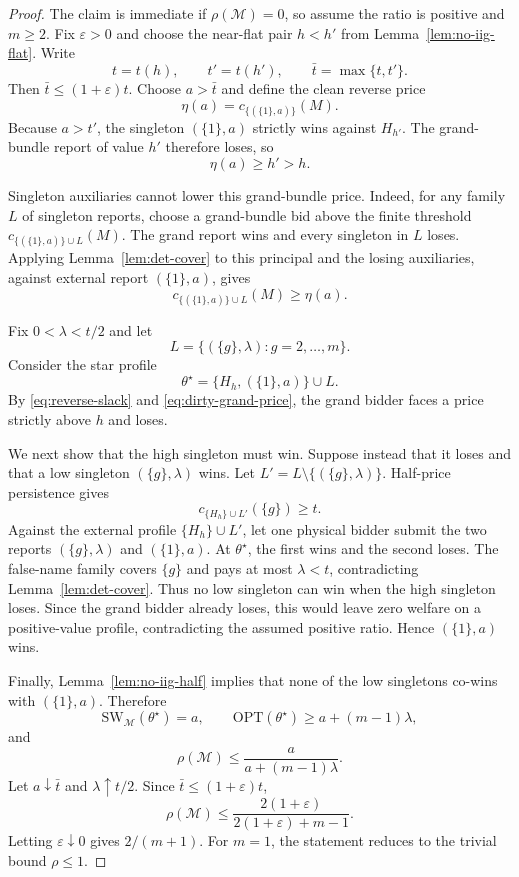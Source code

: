 \documentclass[format=acmsmall, review=false]{acmart}
\newcommand{\OPT}{\mathrm{OPT}}
\newcommand{\SW}{\mathrm{SW}}
\newcommand{\eps}{\varepsilon}
\begin{document}
\begin{proof}
The claim is immediate if $\rho(\mathcal M)=0$, so assume the ratio is
positive and $m\ge2$.  Fix $\eps>0$ and choose the near-flat pair $h<h'$ from
Lemma~\ref{lem:no-iig-flat}.  Write
\[
  t=t(h),
  \qquad
  t'=t(h'),
  \qquad
  \bar t=\max\{t,t'\}.
\]
Then $\bar t\le(1+\eps)t$.  Choose $a>\bar t$ and define the clean reverse
price
\[
  \eta(a)=c_{\{(\{1\},a)\}}(M).
\]
Because $a>t'$, the singleton $(\{1\},a)$ strictly wins against $H_{h'}$.
The grand-bundle report of value $h'$ therefore loses, so
\begin{equation}
  \eta(a)\ge h'>h.
  \label{eq:reverse-slack}
\end{equation}

Singleton auxiliaries cannot lower this grand-bundle price.  Indeed, for any
family $L$ of singleton reports, choose a grand-bundle bid above the finite
threshold $c_{\{(\{1\},a)\}\cup L}(M)$.  The grand report wins and every
singleton in $L$ loses.  Applying Lemma~\ref{lem:det-cover} to this principal
and the losing auxiliaries, against external report $(\{1\},a)$, gives
\begin{equation}
  c_{\{(\{1\},a)\}\cup L}(M)\ge\eta(a).
  \label{eq:dirty-grand-price}
\end{equation}

Fix $0<\lambda<t/2$ and let
\[
  L=\{(\{g\},\lambda):g=2,\ldots,m\}.
\]
Consider the star profile
\begin{equation}
  \theta^\star=\{H_h,(\{1\},a)\}\cup L.
  \label{eq:no-iig-star}
\end{equation}
By \eqref{eq:reverse-slack} and \eqref{eq:dirty-grand-price}, the grand bidder
faces a price strictly above $h$ and loses.

We next show that the high singleton must win.  Suppose instead that it loses
and that a low singleton $(\{g\},\lambda)$ wins.  Let
$L'=L\setminus\{(\{g\},\lambda)\}$.  Half-price persistence gives
\[
  c_{\{H_h\}\cup L'}(\{g\})\ge t.
\]
Against the external profile $\{H_h\}\cup L'$, let one physical bidder submit
the two reports $(\{g\},\lambda)$ and $(\{1\},a)$.  At $\theta^\star$, the
first wins and the second loses.  The false-name family covers $\{g\}$ and
pays at most $\lambda<t$,
contradicting Lemma~\ref{lem:det-cover}.  Thus no low singleton can win when
the high singleton loses.  Since the grand bidder already loses, this would
leave zero welfare on a positive-value profile, contradicting the assumed
positive ratio.  Hence $(\{1\},a)$ wins.

Finally, Lemma~\ref{lem:no-iig-half} implies that none of the low singletons
co-wins with $(\{1\},a)$.  Therefore
\[
  \SW_{\mathcal M}(\theta^\star)=a,
  \qquad
  \OPT(\theta^\star)\ge a+(m-1)\lambda,
\]
and
\[
  \rho(\mathcal M)
  \le\frac{a}{a+(m-1)\lambda}.
\]
Let $a\downarrow\bar t$ and $\lambda\uparrow t/2$.  Since
$\bar t\le(1+\eps)t$,
\[
  \rho(\mathcal M)
  \le
  \frac{2(1+\eps)}{2(1+\eps)+m-1}.
\]
Letting $\eps\downarrow0$ gives $2/(m+1)$.  For $m=1$, the statement reduces
to the trivial bound $\rho\le1$.
\end{proof}
\end{document}

